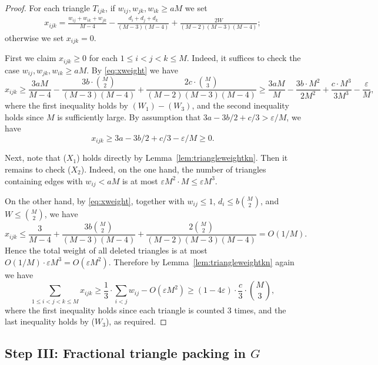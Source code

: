 \documentclass[11pt,reqno]{amsart}
\theoremstyle{definition}
\theoremstyle{remark}
\renewcommand\leq{\leqslant}
\renewcommand\geq{\geqslant}
\renewcommand\le{\leqslant}
\begin{document}
\begin{proof}
For each triangle $T_{ijk}$, if $w_{ij},w_{jk},w_{ik}\geq aM$ we set
\begin{align}\label{eq:xweight}
x_{ijk}=\frac{w_{ij} + w_{ik} + w_{jk}}{M-4} - \frac{d_i + d_j + d_k}{(M-3)(M-4)} + \frac{2W}{(M-2)(M-3)(M-4)};
\end{align}
otherwise we set $x_{ijk}=0$. 

First we claim $x_{ijk}\geq 0$ for each $1\leq i<j<k\leq M$. Indeed, it suffices to check the case $w_{ij},w_{jk},w_{ik}\geq aM$. By \eqref{eq:xweight} we have
$$x_{ijk}\geq \frac{3aM}{M-4}-\frac{3b\cdot\binom{M}{2}}{(M-3)(M-4)} + \frac{2c\cdot\binom{M}{3}}{(M-2)(M-3)(M-4)}\geq \frac{3aM}{M}-\frac{3b\cdot M^2}{2M^2}+\frac{c\cdot M^3}{3M^3}-\frac{\varepsilon}{M},$$
where the first inequality holds by $(W_1)-(W_3)$, and the second inequality holds since $M$ is sufficiently large. By assumption that $3a-3b/2+c/3>\varepsilon/M$, we have
$$x_{ijk}\geq 3a-3b/2+c/3-\varepsilon/M \geq 0.$$

Next, note that ($X_1$) holds directly by Lemma~\ref{lem:triangleweightkn}. Then it remains to check ($X_2$). Indeed, on the one hand, the number of triangles containing edges with $w_{ij}<aM$ is at most $\varepsilon M^2\cdot M\leq \varepsilon M^3$. 

On the other hand, by \eqref{eq:xweight}, together with $w_{ij}\le 1$, $d_i\le b\binom{M}{2}$, and $W\le \binom{M}{2}$, we have
\[
x_{ijk}\le \frac{3}{M-4}+\frac{3b\binom{M}{2}}{(M-3)(M-4)}+\frac{2\binom{M}{2}}{(M-2)(M-3)(M-4)}=O(1/M).
\]
Hence the total weight of all deleted triangles is at most $O(1/M)\cdot \varepsilon M^3=O(\varepsilon M^2)$. Therefore by Lemma~\ref{lem:triangleweightkn} again we have
$$\sum_{1\leq i<j<k\leq M}x_{ijk}\geq\frac{1}{3}\cdot\sum_{i<j}w_{ij}-O(\varepsilon M^2)\geq (1-4\varepsilon)\cdot \frac{c}{3}\cdot\binom{M}{3},$$
where the first inequality holds since each triangle is counted 3 times, and the last inequality holds by ($W_3$), as required.
\end{proof}











 

\subsection{Step III: Fractional triangle packing in $G$} 
\end{document}
